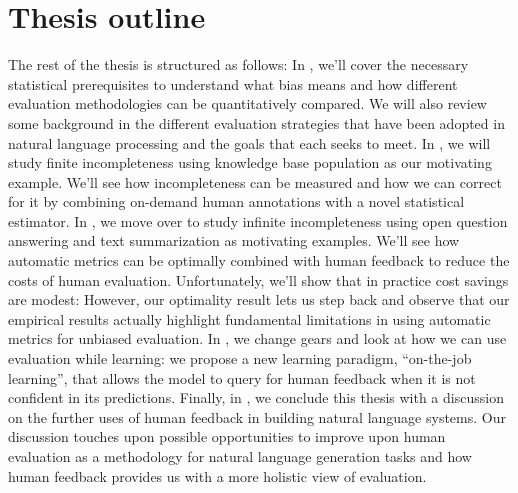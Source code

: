 \section{Thesis outline}
The rest of the thesis is structured as follows:
In , we'll cover the necessary statistical prerequisites to understand what bias means and how different evaluation methodologies can be quantitatively compared.
We will also review some background in the different evaluation strategies that have been adopted in natural language processing and the goals that each seeks to meet.
In , we will study finite incompleteness using knowledge base population as our motivating example.
We'll see how incompleteness can be measured and how we can correct for it by combining on-demand human annotations with a novel statistical estimator.
In , we move over to study infinite incompleteness using open question answering and text summarization as motivating examples.
We'll see how automatic metrics can be optimally combined with human feedback to reduce the costs of human evaluation.
Unfortunately, we'll show that in practice cost savings are modest: 
However, our optimality result lets us step back and observe that our empirical results actually highlight fundamental limitations in using automatic metrics for unbiased evaluation. 
In , we change gears and look at how we can use evaluation  while learning: we propose a new learning paradigm, ``on-the-job learning'', that allows the model to query for human feedback when it is not confident in its predictions.
Finally, in , we conclude this thesis with a discussion on the further uses of human feedback in building natural language systems.
Our discussion touches upon possible opportunities to improve upon human evaluation as a methodology for natural language generation tasks and how human feedback provides us with a more holistic view of evaluation.
